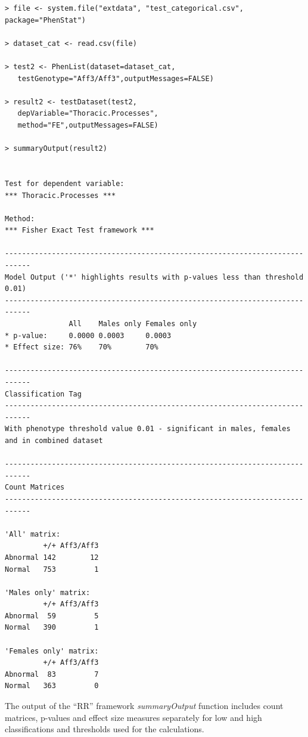 \documentclass[12pt,a4paper]{article}
\begin{document}
\begingroup
    \fontsize{8pt}{12pt}\selectfont
\begin{verbatim}
> file <- system.file("extdata", "test_categorical.csv", package="PhenStat")
 
> dataset_cat <- read.csv(file)

> test2 <- PhenList(dataset=dataset_cat,
   testGenotype="Aff3/Aff3",outputMessages=FALSE)

> result2 <- testDataset(test2,
   depVariable="Thoracic.Processes",
   method="FE",outputMessages=FALSE)  

> summaryOutput(result2)


Test for dependent variable:
*** Thoracic.Processes ***

Method:
*** Fisher Exact Test framework ***

----------------------------------------------------------------------------
Model Output ('*' highlights results with p-values less than threshold 0.01)
----------------------------------------------------------------------------
               All    Males only Females only
* p-value:     0.0000 0.0003     0.0003      
* Effect size: 76%    70%        70%         

----------------------------------------------------------------------------
Classification Tag
----------------------------------------------------------------------------
With phenotype threshold value 0.01 - significant in males, females and in combined dataset

----------------------------------------------------------------------------
Count Matrices
----------------------------------------------------------------------------

'All' matrix:
         +/+ Aff3/Aff3
Abnormal 142        12
Normal   753         1

'Males only' matrix:
         +/+ Aff3/Aff3
Abnormal  59         5
Normal   390         1

'Females only' matrix:
         +/+ Aff3/Aff3
Abnormal  83         7
Normal   363         0
\end{verbatim}
\endgroup

The output of the “RR” framework \textit{summaryOutput} function includes count matrices, p-values and effect size measures separately for low and high classifications and thresholds used for the calculations.
\end{document}
